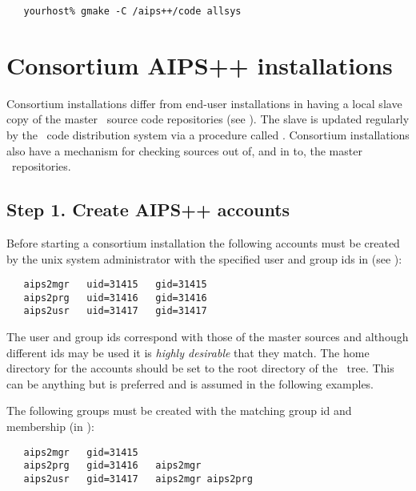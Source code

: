 \begin{verbatim}
   yourhost% gmake -C /aips++/code allsys
\end{verbatim}


\section{Consortium AIPS++ installations}
\label{Consortium installation}

Consortium installations differ from end-user installations in having a local
slave copy of the master \rcs\ source code repositories (see
).  The slave is updated regularly by the \aipspp\ code
distribution system via a procedure called .  Consortium
installations also have a mechanism for checking sources out of, and in to,
the master \rcs\ repositories.

\subsection*{Step 1. Create AIPS++ accounts}

Before starting a consortium installation the following accounts must be
created by the unix system administrator with the specified user and group ids
in  (see ):

\begin{verbatim}
   aips2mgr   uid=31415   gid=31415
   aips2prg   uid=31416   gid=31416
   aips2usr   uid=31417   gid=31417
\end{verbatim}

\noindent
The user and group ids correspond with those of the master sources and
although different ids may be used it is {\em highly desirable} that they
match.  The home directory for the accounts should be set to the root
directory of the \aipspp\ tree.  This can be anything but  is
preferred and is assumed in the following examples.

The following groups must be created with the matching group id and membership
(in ):

\begin{verbatim}
   aips2mgr   gid=31415
   aips2prg   gid=31416   aips2mgr
   aips2usr   gid=31417   aips2mgr aips2prg
\end{verbatim}

